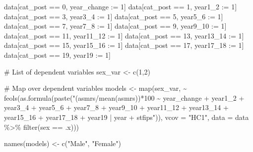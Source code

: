 \documentclass[
  letterpaper,
  DIV=11,
  numbers=noendperiod]{scrartcl}
\newenvironment{Shaded}{\begin{snugshade}}{\end{snugshade}}
\newcommand{\AttributeTok}[1]{\textcolor[rgb]{0.40,0.45,0.13}{#1}}
\newcommand{\CommentTok}[1]{\textcolor[rgb]{0.37,0.37,0.37}{#1}}
\newcommand{\DecValTok}[1]{\textcolor[rgb]{0.68,0.00,0.00}{#1}}
\newcommand{\ErrorTok}[1]{\textcolor[rgb]{0.68,0.00,0.00}{#1}}
\newcommand{\FunctionTok}[1]{\textcolor[rgb]{0.28,0.35,0.67}{#1}}
\newcommand{\NormalTok}[1]{\textcolor[rgb]{0.00,0.23,0.31}{#1}}
\newcommand{\OtherTok}[1]{\textcolor[rgb]{0.00,0.23,0.31}{#1}}
\newcommand{\SpecialCharTok}[1]{\textcolor[rgb]{0.37,0.37,0.37}{#1}}
\newcommand{\StringTok}[1]{\textcolor[rgb]{0.13,0.47,0.30}{#1}}
\begin{document}
\begin{Shaded}
\begin{Highlighting}[]
\NormalTok{data[cat\_post }\SpecialCharTok{==} \DecValTok{0}\NormalTok{, year\_change }\SpecialCharTok{:}\ErrorTok{=} \DecValTok{1}\NormalTok{]}
\NormalTok{data[cat\_post }\SpecialCharTok{==} \DecValTok{1}\NormalTok{, year1\_2 }\SpecialCharTok{:}\ErrorTok{=} \DecValTok{1}\NormalTok{]}
\NormalTok{data[cat\_post }\SpecialCharTok{==} \DecValTok{3}\NormalTok{, year3\_4 }\SpecialCharTok{:}\ErrorTok{=} \DecValTok{1}\NormalTok{]}
\NormalTok{data[cat\_post }\SpecialCharTok{==} \DecValTok{5}\NormalTok{, year5\_6 }\SpecialCharTok{:}\ErrorTok{=} \DecValTok{1}\NormalTok{]}
\NormalTok{data[cat\_post }\SpecialCharTok{==} \DecValTok{7}\NormalTok{, year7\_8 }\SpecialCharTok{:}\ErrorTok{=} \DecValTok{1}\NormalTok{]}
\NormalTok{data[cat\_post }\SpecialCharTok{==} \DecValTok{9}\NormalTok{, year9\_10 }\SpecialCharTok{:}\ErrorTok{=} \DecValTok{1}\NormalTok{]}
\NormalTok{data[cat\_post }\SpecialCharTok{==} \DecValTok{11}\NormalTok{, year11\_12 }\SpecialCharTok{:}\ErrorTok{=} \DecValTok{1}\NormalTok{]}
\NormalTok{data[cat\_post }\SpecialCharTok{==} \DecValTok{13}\NormalTok{, year13\_14 }\SpecialCharTok{:}\ErrorTok{=} \DecValTok{1}\NormalTok{]}
\NormalTok{data[cat\_post }\SpecialCharTok{==} \DecValTok{15}\NormalTok{, year15\_16 }\SpecialCharTok{:}\ErrorTok{=} \DecValTok{1}\NormalTok{]}
\NormalTok{data[cat\_post }\SpecialCharTok{==} \DecValTok{17}\NormalTok{, year17\_18 }\SpecialCharTok{:}\ErrorTok{=} \DecValTok{1}\NormalTok{]}
\NormalTok{data[cat\_post }\SpecialCharTok{==} \DecValTok{19}\NormalTok{, year19 }\SpecialCharTok{:}\ErrorTok{=} \DecValTok{1}\NormalTok{]}

\CommentTok{\# List of dependent variables}
\NormalTok{sex\_var }\OtherTok{\textless{}{-}} \FunctionTok{c}\NormalTok{(}\DecValTok{1}\NormalTok{,}\DecValTok{2}\NormalTok{)}

\CommentTok{\# Map over dependent variables}
\NormalTok{models }\OtherTok{\textless{}{-}} \FunctionTok{map}\NormalTok{(sex\_var, }\SpecialCharTok{\textasciitilde{}} \FunctionTok{feols}\NormalTok{(}\FunctionTok{as.formula}\NormalTok{(}\FunctionTok{paste}\NormalTok{(}\StringTok{"(asmrs/mean(asmrs))*100 \textasciitilde{} year\_change + year1\_2 + year3\_4 + year5\_6 + year7\_8 + year9\_10 + year11\_12 + year13\_14 + year15\_16 + year17\_18 + year19 | year + stfips"}\NormalTok{)), }\AttributeTok{vcov =} \StringTok{"HC1"}\NormalTok{, }\AttributeTok{data =}\NormalTok{ data }\SpecialCharTok{\%\textgreater{}\%} \FunctionTok{filter}\NormalTok{(sex }\SpecialCharTok{==}\NormalTok{ .x)))}

\FunctionTok{names}\NormalTok{(models) }\OtherTok{\textless{}{-}} \FunctionTok{c}\NormalTok{(}\StringTok{"Male"}\NormalTok{, }\StringTok{"Female"}\NormalTok{)}


\end{Highlighting}
\end{Shaded}
\end{document}
